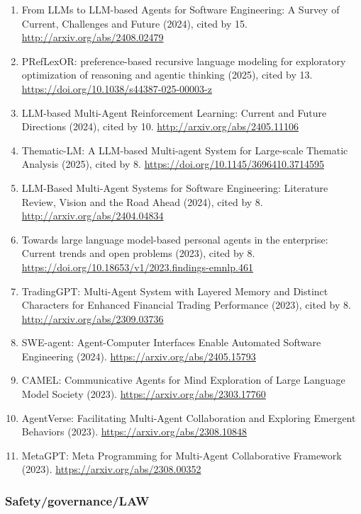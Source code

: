 \documentclass[
]{article}
\begin{document}
\begin{enumerate}
  \url{http://arxiv.org/abs/2305.19118}
\item
  From LLMs to LLM-based Agents for Software Engineering: A Survey of
  Current, Challenges and Future (2024), cited by 15.
  \url{http://arxiv.org/abs/2408.02479}
\item
  PRefLexOR: preference-based recursive language modeling for
  exploratory optimization of reasoning and agentic thinking (2025),
  cited by 13. \url{https://doi.org/10.1038/s44387-025-00003-z}
\item
  LLM-based Multi-Agent Reinforcement Learning: Current and Future
  Directions (2024), cited by 10. \url{http://arxiv.org/abs/2405.11106}
\item
  Thematic-LM: A LLM-based Multi-agent System for Large-scale Thematic
  Analysis (2025), cited by 8.
  \url{https://doi.org/10.1145/3696410.3714595}
\item
  LLM-Based Multi-Agent Systems for Software Engineering: Literature
  Review, Vision and the Road Ahead (2024), cited by 8.
  \url{http://arxiv.org/abs/2404.04834}
\item
  Towards large language model-based personal agents in the enterprise:
  Current trends and open problems (2023), cited by 8.
  \url{https://doi.org/10.18653/v1/2023.findings-emnlp.461}
\item
  TradingGPT: Multi-Agent System with Layered Memory and Distinct
  Characters for Enhanced Financial Trading Performance (2023), cited by
  8. \url{http://arxiv.org/abs/2309.03736}
\item
  SWE-agent: Agent-Computer Interfaces Enable Automated Software
  Engineering (2024). \url{https://arxiv.org/abs/2405.15793}
\item
  CAMEL: Communicative Agents for Mind Exploration of Large Language
  Model Society (2023). \url{https://arxiv.org/abs/2303.17760}
\item
  AgentVerse: Facilitating Multi-Agent Collaboration and Exploring
  Emergent Behaviors (2023). \url{https://arxiv.org/abs/2308.10848}
\item
  MetaGPT: Meta Programming for Multi-Agent Collaborative Framework
  (2023). \url{https://arxiv.org/abs/2308.00352}
\end{enumerate}

\hypertarget{safetygovernancelaw}{%
\subsubsection{Safety/governance/LAW}\label{safetygovernancelaw}}
\end{document}
